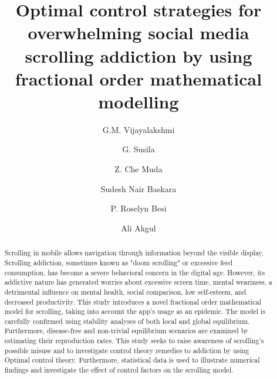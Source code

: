 \documentclass[10pt]{article}
\begin{document}
	
	\title{Optimal control strategies for overwhelming social media scrolling addiction by using fractional order mathematical modelling}
	
	\author[1]{G.M. Vijayalakshmi}
	\author[1]{G. Susila}
	\author[2]{Z. Che Muda}
	\author[2]{Sudesh Nair Baskara}
	\author[3]{P. Roselyn Besi}
	\author[4]{Ali Akgul}
	
	
	\renewcommand\Affilfont{\itshape\small}
	\newcommand{\mail}[1]{\vspace{0.5cm}\noindent\textit{Corresponding author:} #1}
	
	\maketitle
	
	\begin{abstract}
		\noindent Scrolling in mobile allows navigation through information beyond the visible display. Scrolling addiction, sometimes known as "doom scrolling" or excessive feed consumption, has become a severe behavioral concern in the digital age. However, its addictive nature has generated worries about excessive screen time, mental weariness, a detrimental influence on mental health, social comparison, low self-esteem, and decreased productivity. This study introduces a novel fractional order mathematical model for scrolling, taking into account the app's usage as an epidemic. The model is carefully confirmed using stability analyses of both local and global equilibrium. Furthermore, disease-free and non-trivial equilibrium scenarios are examined by estimating their reproduction rates. This study seeks to raise awareness of scrolling's possible misuse and to investigate control theory remedies to addiction by using Optimal control theory. Furthermore, statistical data is used to illustrate numerical findings and investigate the effect of control factors on the scrolling model.
	\end{abstract}
	
\end{document}
